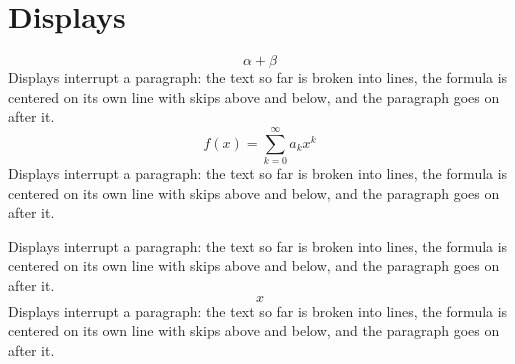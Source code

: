 \documentclass[12pt]{article}
\begin{document}
\section{Displays}
\[ \alpha+\beta \]
Displays interrupt a paragraph: the text so far is broken into lines, the formula is centered on its own line with skips above and below, and the paragraph goes on after it.
\[ f(x)=\sum_{k=0}^\infty a_k x^k \]
Displays interrupt a paragraph: the text so far is broken into lines, the formula is centered on its own line with skips above and below, and the paragraph goes on after it.

Displays interrupt a paragraph: the text so far is broken into lines, the formula is centered on its own line with skips above and below, and the paragraph goes on after it. \begin{equation*} x \end{equation*} Displays interrupt a paragraph: the text so far is broken into lines, the formula is centered on its own line with skips above and below, and the paragraph goes on after it.
\end{document}

